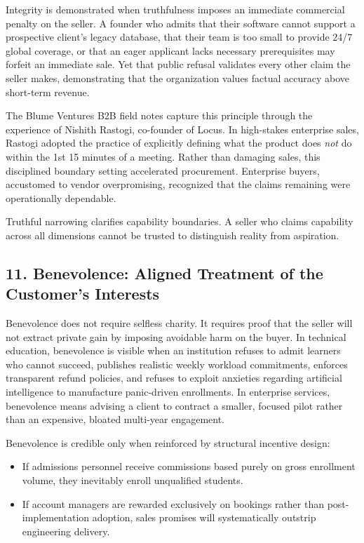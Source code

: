 Integrity is demonstrated when truthfulness imposes an immediate commercial penalty on the seller. A founder who admits that their software cannot support a prospective client's legacy database, that their team is too small to provide 24/7 global coverage, or that an eager applicant lacks necessary prerequisites may forfeit an immediate sale. Yet that public refusal validates every other claim the seller makes, demonstrating that the organization values factual accuracy above short-term revenue.

The Blume Ventures B2B field notes capture this principle through the experience of Nishith Rastogi, co-founder of Locus. In high-stakes enterprise sales, Rastogi adopted the practice of explicitly defining what the product does \emph{not} do within the 1st 15 minutes of a meeting. Rather than damaging sales, this disciplined boundary setting accelerated procurement. Enterprise buyers, accustomed to vendor overpromising, recognized that the claims remaining were operationally dependable. 

Truthful narrowing clarifies capability boundaries. A seller who claims capability across all dimensions cannot be trusted to distinguish reality from aspiration.

\subsection*{11. Benevolence: Aligned Treatment of the Customer's Interests}

Benevolence does not require selfless charity. It requires proof that the seller will not extract private gain by imposing avoidable harm on the buyer. In technical education, benevolence is visible when an institution refuses to admit learners who cannot succeed, publishes realistic weekly workload commitments, enforces transparent refund policies, and refuses to exploit anxieties regarding artificial intelligence to manufacture panic-driven enrollments. In enterprise services, benevolence means advising a client to contract a smaller, focused pilot rather than an expensive, bloated multi-year engagement.

Benevolence is credible only when reinforced by structural incentive design:
\begin{itemize}
\item If admissions personnel receive commissions based purely on gross enrollment volume, they inevitably enroll unqualified students.
\item If account managers are rewarded exclusively on bookings rather than post-implementation adoption, sales promises will systematically outstrip engineering delivery.
\end{itemize}

